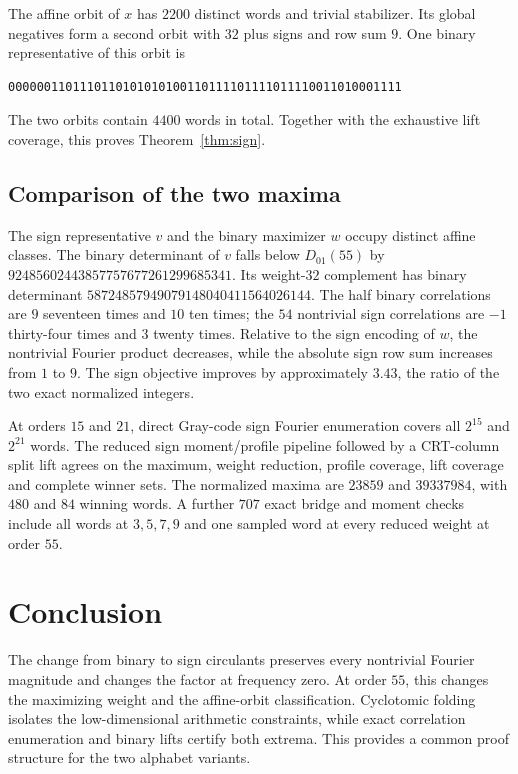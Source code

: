 \documentclass[11pt,a4paper]{article}
\theoremstyle{remark}
\begin{document}
The affine orbit of $x$ has $2200$ distinct words and trivial
stabilizer. Its global negatives form a second orbit with $32$
plus signs and row sum $9$. One binary representative of this orbit is
\begin{lstlisting}
0000001101110110101010100110111101111011110011010001111
\end{lstlisting}
The two orbits contain $4400$ words in total.
Together with the exhaustive lift coverage, this proves
Theorem~\ref{thm:sign}.


\subsection{Comparison of the two maxima}

The sign representative $v$ and the binary maximizer $w$
occupy distinct affine classes.  The binary determinant
of $v$ falls below $D_{01}(55)$ by
$92485602443857757677261299685341$. Its weight-$32$ complement has
binary determinant $58724857949079148040411564026144$.
The half binary correlations are $9$ seventeen times and $10$ ten times;
the $54$ nontrivial sign correlations are $-1$ thirty-four times and
$3$ twenty times. Relative to the sign encoding of $w$, the nontrivial
Fourier product decreases, while the absolute sign row sum
increases from $1$ to $9$. The sign objective improves by approximately
$3.43$, the ratio of the two exact normalized integers.

At orders $15$ and $21$, direct Gray-code sign Fourier enumeration
covers all $2^{15}$ and $2^{21}$ words. The reduced sign moment/profile
pipeline followed by a CRT-column split lift agrees on the maximum,
weight reduction, profile coverage, lift coverage and complete winner
sets. The normalized maxima are $23859$ and $39337984$, with $480$
and $84$ winning words. A further $707$ exact bridge and moment checks
include all words at $3,5,7,9$ and one sampled word at every reduced
weight at order $55$.


\section{Conclusion}

The change from binary to sign circulants preserves every
nontrivial Fourier magnitude and changes the factor at frequency
zero. At order $55$, this changes the maximizing weight and
the affine-orbit classification. Cyclotomic folding isolates
the low-dimensional arithmetic constraints, while exact
correlation enumeration and binary lifts certify both extrema.
This provides a common proof structure for the two alphabet
variants.
\end{document}
